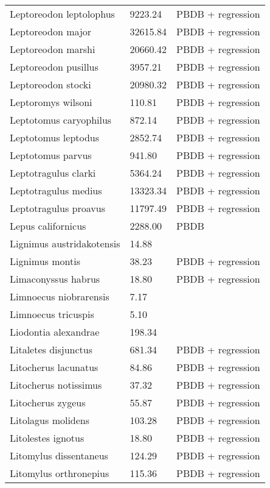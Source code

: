\documentclass{article}
\begin{document}
\begin{center}
\begin{longtable}{p{} p{} p{}}
    Leptoreodon leptolophus & 9223.24 & PBDB + regression \\ 
    Leptoreodon major & 32615.84 & PBDB + regression \\ 
    Leptoreodon marshi & 20660.42 & PBDB + regression \\ 
    Leptoreodon pusillus & 3957.21 & PBDB + regression \\ 
    Leptoreodon stocki & 20980.32 & PBDB + regression \\ 
    Leptoromys wilsoni & 110.81 & PBDB + regression \\ 
    Leptotomus caryophilus & 872.14 & PBDB + regression \\ 
    Leptotomus leptodus & 2852.74 & PBDB + regression \\ 
    Leptotomus parvus & 941.80 & PBDB + regression \\ 
    Leptotragulus clarki & 5364.24 & PBDB + regression \\ 
    Leptotragulus medius & 13323.34 & PBDB + regression \\ 
    Leptotragulus proavus & 11797.49 & PBDB + regression \\ 
    Lepus californicus & 2288.00 & PBDB \\ 
    Lignimus austridakotensis & 14.88 & \cite{Tomiya2013} \\ 
    Lignimus montis & 38.23 & PBDB + regression \\ 
    Limaconyssus habrus & 18.80 & PBDB + regression \\ 
    Limnoecus niobrarensis & 7.17 & \cite{Tomiya2013} \\ 
    Limnoecus tricuspis & 5.10 & \cite{Tomiya2013} \\ 
    Liodontia alexandrae & 198.34 & \cite{Tomiya2013} \\ 
    Litaletes disjunctus & 681.34 & PBDB + regression \\ 
    Litocherus lacunatus & 84.86 & PBDB + regression \\ 
    Litocherus notissimus & 37.32 & PBDB + regression \\ 
    Litocherus zygeus & 55.87 & PBDB + regression \\ 
    Litolagus molidens & 103.28 & PBDB + regression \\ 
    Litolestes ignotus & 18.80 & PBDB + regression \\ 
    Litomylus dissentaneus & 124.29 & PBDB + regression \\ 
    Litomylus orthronepius & 115.36 & PBDB + regression \\ 

\end{longtable}
\end{center}
\end{document}
